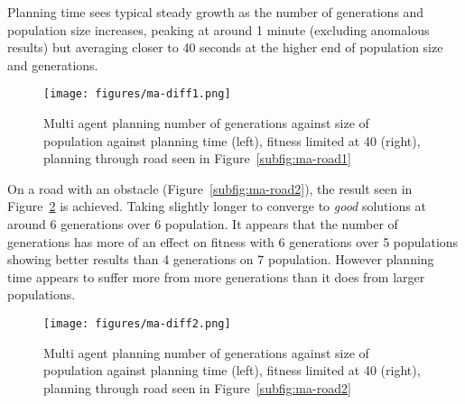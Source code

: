 Planning time sees typical steady growth as the number of generations and population size increases, peaking at around 1 minute (excluding anomalous results) but averaging closer to 40 seconds at the higher end of population size and generations.

\begin{figure}[ht]
  \centering
  \texttt{[image: figures/ma-diff1.png]}
  \caption{\label{fig:ma-diff1-lim40} Multi agent planning number of generations against size of population against planning time (left), fitness limited at 40 (right), planning through road seen in Figure~\ref{subfig:ma-road1}}
\end{figure}

On a road with an obstacle (Figure~\ref{subfig:ma-road2}), the result seen in Figure~\ref{fig:ma-diff2-lim40} is achieved. Taking slightly longer to converge to \textit{good} solutions at around 6 generations over 6 population. It appears that the number of generations has more of an effect on fitness with 6 generations over 5 populations showing better results than 4 generations on 7 population. However planning time appears to suffer more from more generations than it does from larger populations.

\begin{figure}[ht]
  \centering
  \texttt{[image: figures/ma-diff2.png]}
  \caption{\label{fig:ma-diff2-lim40} Multi agent planning number of generations against size of population against planning time (left), fitness limited at 40 (right), planning through road seen in Figure~\ref{subfig:ma-road2}}
\end{figure}

